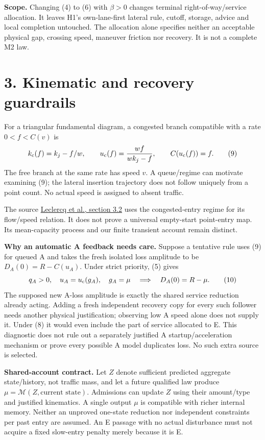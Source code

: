 \documentclass[11pt,a4paper]{article}
\begin{document}
\textbf{Scope.} Changing (4) to (6) with $\beta>0$ changes terminal
right-of-way/service allocation. It leaves H1's own-lane-first lateral
rule, cutoff, storage, advice and local completion untouched. The allocation
alone specifies neither an acceptable physical gap, crossing speed,
maneuver friction nor recovery. It is not a complete M2 law.

\newpage
\section*{3. Kinematic and recovery guardrails}

For a triangular fundamental diagram, a congested branch compatible with
a rate $0<f<C(v)$ is
\begin{equation}
 k_{\rm c}(f)=k_j-f/w,\qquad
 u_{\rm c}(f)=\frac{wf}{wk_j-f},\qquad C(u_{\rm c}(f))=f. \tag{9}
\end{equation}
The free branch at the same rate has speed $v$. A queue/regime can motivate
examining (9); the lateral insertion trajectory does not follow uniquely
from a point count. No actual speed is assigned to absent traffic.

The source
\href{https://repository.tudelft.nl/file/File_c424c1b3-7374-436b-a6a7-abdf69063aa6}{Leclercq et al., section 3.2}
uses the congested-entry regime for its flow/speed relation. It does not
prove a universal empty-start point-entry map. Its mean-capacity process
and our finite transient account remain distinct.

\textbf{Why an automatic A feedback needs care.} Suppose a tentative rule
uses (9) for queued A and takes the fresh isolated loss amplitude to be
$D_A(0)=R-C(u_A)$. Under strict priority, (5) gives
\begin{equation}
 q_A>0,\quad u_A=u_{\rm c}(g_A),\quad g_A=\mu
 \quad\Longrightarrow\quad D_A(0)=R-\mu. \tag{10}
\end{equation}
The supposed new A-loss amplitude is exactly the shared service reduction
already acting. Adding a fresh independent recovery copy for every such
follower needs another physical justification; observing low A speed alone
does not supply it. Under (8) it would even include the part of service
allocated to E. This diagnostic does not rule out a separately justified
A startup/acceleration mechanism or prove every possible A model duplicates
loss. No such extra source is selected.

\textbf{Shared-account contract.} Let $Z$ denote sufficient predicted
aggregate state/history, not traffic mass, and let a future qualified law
produce $\mu=\mathcal M(Z,\text{current state})$. Admissions can update
$Z$ using their amount/type and justified kinematics. A single output
$\mu$ is compatible with richer internal memory. Neither an unproved
one-state reduction nor independent constraints per past entry are assumed.
An E passage with no actual disturbance must not acquire a fixed slow-entry
penalty merely because it is E.
\end{document}
